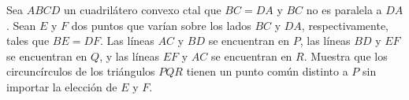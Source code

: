 Sea $ABCD$ un cuadrilátero convexo ctal que $BC=DA$ y $BC$ no es paralela a $DA$. Sean $E$ y $F$ dos puntos que varían sobre los lados $BC$ y $DA$, respectivamente, tales que $BE=DF$. Las líneas $AC$ y $BD$ se encuentran en $P$, las líneas $BD$ y $EF$ se encuentran en $Q$, y las líneas $EF$ y $AC$ se encuentran en $R$. Muestra que los circuncírculos de los triángulos $PQR$ tienen un punto común distinto a $P$ sin importar la elección de $E$ y $F$.
